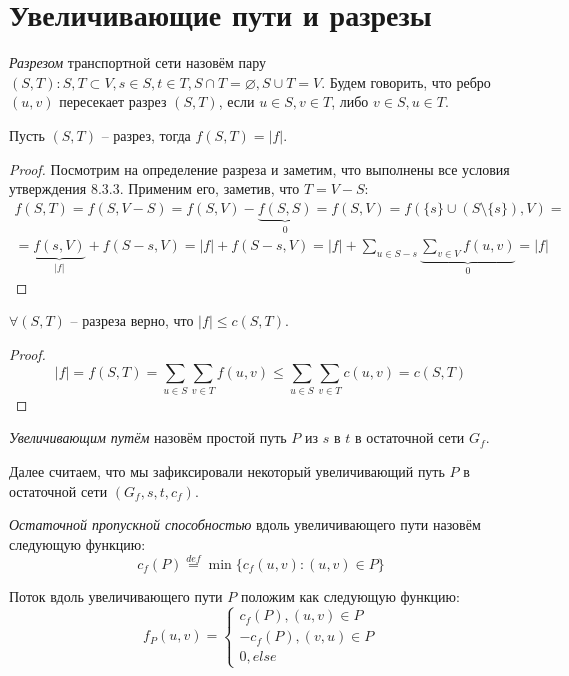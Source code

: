 \section{Увеличивающие пути и разрезы}

\Def \textit{Разрезом} транспортной сети назовём пару $(S, T): S, T \subset V, s \in S, t \in T, S \cap T = \varnothing, S \cup T = V$.
Будем говорить, что ребро $(u, v)$ пересекает разрез $(S, T)$, если $u \in S, v \in T$, либо $v \in S, u \in T$.

\Lm Пусть $(S, T)$ -- разрез, тогда $f(S, T) = |f|$.
\begin{proof}
    
    Посмотрим на определение разреза и заметим, что выполнены все условия утверждения 8.3.3. Применим его, заметив, что $T = V - S$:
    \begin{multline*}
        f(S, T) = f(S, V - S) = f(S, V) - \underbrace{f(S, S)}_{0} = f(S, V) = f(\{s\} \cup (S \setminus \{s\}), V) = \\
        = \underbrace{f(s, V)}_{|f|} + f(S - s, V) = |f| + f(S - s, V) = |f| + \sum\limits_{u \in S - s} \underbrace{\sum\limits_{v \in V} f(u, v)}_{0} = |f|
    \end{multline*} 
\end{proof}

\Cons $\forall (S, T)$ -- разреза верно, что $|f| \leq c(S, T)$.
\begin{proof}
    \begin{equation*}
        |f| = f(S, T) = \sum\limits_{u \in S} \sum\limits_{v \in T} f(u, v) \leq \sum\limits_{u \in S} \sum\limits_{v \in T} c(u, v) = c(S, T)
    \end{equation*}
\end{proof}

\Def \textit{Увеличивающим путём} назовём простой путь $P$ из $s$ в $t$ в остаточной сети $G_f$.

Далее считаем, что мы зафиксировали некоторый увеличивающий путь $P$ в остаточной сети $(G_f, s, t, c_f)$.

\Def \textit{Остаточной пропускной способностью} вдоль увеличивающего пути назовём следующую функцию:
\begin{equation*}
    c_f(P) \overset{def}{=} \min\{ c_f(u, v): (u, v) \in P \}
\end{equation*}

\Def Поток вдоль увеличивающего пути $P$ положим как следующую функцию:
\begin{equation*}
    f_P(u, v) = \begin{cases}
        c_f(P), (u, v) \in P \\
        -c_f(P), (v, u) \in P \\
        0, else
    \end{cases}
\end{equation*}

